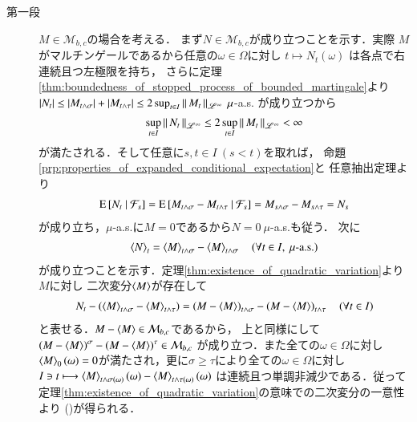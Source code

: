 	\begin{prf}\mbox{}
		\begin{description}
			\item[第一段] $M \in \mathcal{M}_{b,c}$の場合を考える．
				まず$N \in \mathcal{M}_{b,c}$が成り立つことを示す．実際
				$M$がマルチンゲールであるから任意の$\omega \in \Omega$に対し
				$t \longmapsto N_t(\omega)$
				は各点で右連続且つ左極限を持ち，
				さらに定理\ref{thm:boundedness_of_stopped_process_of_bounded_martingale}より
				$|N_t| \leq |M_{t\wedge\sigma}| + |M_{t\wedge\tau}| \leq 2 \sup{t \in I}{\Norm{M_t}{\mathscr{L}^\infty}}\ \mu$-a.s.
				が成り立つから
				\begin{align}
					\operatorname*{sup}_{t \in I} \left\|\, N_t\, \right\|_{\mathscr{L}^\infty}
					\leq 2 \operatorname*{sup}_{t \in I} \left\|\, M_t\, \right\|_{\mathscr{L}^\infty} < \infty
				\end{align}
				が満たされる．そして任意に$s,t \in I\ (s < t)$を取れば，
				命題\ref{prp:properties_of_expanded_conditional_expectation}と
				任意抽出定理より
				\begin{align}
					\operatorname{E} \left[ N_t \ \middle|\ \mathcal{F}_s \right]
					= \operatorname{E} \left[ M_{t \wedge \sigma} - M_{t \wedge \tau} \ \middle|\ \mathcal{F}_s \right]
					= M_{s \wedge \sigma} - M_{s \wedge \tau}
					= N_s
				\end{align}
				が成り立ち，$\mu$-a.s.に$M = 0$であるから$N = 0\ \mu$-a.s.も従う．
				次に
				\begin{align}
					\inprod<N>_t = \inprod<M>_{t \wedge \sigma} - \inprod<M>_{t \wedge \sigma}
					\quad (\forall t \in I,\ \mbox{$\mu$-a.s.})
					\label{eq:lem_stopped_quadratic_variation}
				\end{align}
				が成り立つことを示す．定理\ref{thm:existence_of_quadratic_variation}より$M$に対し
				二次変分$\inprod<M>$が存在して
				\begin{align}
					N_t - \left( \inprod<M>_{t \wedge \sigma} - \inprod<M>_{t \wedge \tau} \right)
					= \left( M - \inprod<M> \right)_{t \wedge \sigma} - \left( M - \inprod<M> \right)_{t \wedge \tau}
					\quad (\forall t \in I)
				\end{align}
				と表せる．$M - \inprod<M> \in \mathcal{M}_{b,c}$であるから，
				上と同様にして$\left( M - \inprod<M> \right)^\sigma - \left( M - \inprod<M> \right)^\tau \in \mathcal{M}_{b,c}$
				が成り立つ．また全ての$\omega \in \Omega$に対し
				$\inprod<M>_0(\omega) = 0$が満たされ，更に$\sigma \geq \tau$により全ての$\omega \in \Omega$に対し
				$I \ni t \longmapsto \inprod<M>_{t \wedge \sigma(\omega)}(\omega) - \inprod<M>_{t \wedge \tau(\omega)}(\omega)$
				は連続且つ単調非減少である．従って定理\ref{thm:existence_of_quadratic_variation}の意味での二次変分の一意性より
				()が得られる．
				

\end{description}
\end{prf}
